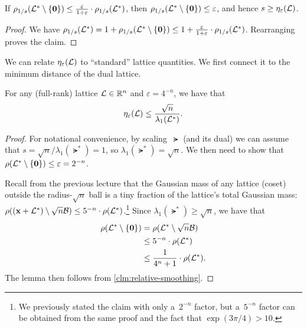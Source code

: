 \documentclass[11pt]{article}
\begin{document}
\begin{claim}
  \label{clm:relative-smoothing}
  If
  $\rho_{1/s}(\mathcal{L}^* \setminus \{\mathbf{0}\}) \leq
  \frac{\varepsilon}{1+\varepsilon} \cdot \rho_{1/s}(\mathcal{L}^*)$, then
  $\rho_{1/s}(\mathcal{L}^* \setminus \{\mathbf{0}\}) \leq \varepsilon$, and
  hence $s \geq \eta_{\varepsilon}(\mathcal{L})$.
\end{claim}

\begin{proof}
  We have
  $\rho_{1/s}(\mathcal{L}^*) = 1 + \rho_{1/s}(\mathcal{L}^* \setminus
  \{\mathbf{0}\}) \leq 1 + \frac{\varepsilon}{1+\varepsilon} \cdot
  \rho_{1/s}(\mathcal{L}^{*})$. Rearranging proves the claim.
\end{proof}

We can relate $\eta_\varepsilon(\mathcal{L})$ to ``standard'' lattice
quantities. We first connect it to the minimum distance of the dual
lattice.

\begin{lemma}
  For any (full-rank) lattice $\mathcal{L} \in \mathbb{R}^{n}$ and
  $\varepsilon = 4^{-n}$, we have that
  \[ \eta_\varepsilon(\mathcal{L}) \leq
    \frac{\sqrt{n}}{\lambda_1(\mathcal{L}^*)} . \]
\end{lemma}

\begin{proof}
  For notational convenience, by scaling~$\lat$ (and its dual) we can
  assume that $s = \sqrt{n}/\lambda_{1}(\lat^{*}) = 1$, so
  $\lambda_{1}(\lat^{*}) = \sqrt{n}$. We then need to show that
  $\rho(\mathcal{L}^* \setminus \{\mathbf{0}\}) \leq \varepsilon = 2^{-n}$.

  Recall from the previous lecture that the Gaussian mass of any
  lattice (coset) outside the radius-$\sqrt{n}$ ball is a tiny
  fraction of the lattice's total Gaussian mass:
  $\rho((\mathbf{x}+\mathcal{L}^*) \setminus \sqrt{n}\mathcal{B}) \leq 5^{-n} \cdot
  \rho(\mathcal{L}^*)$.\footnote{We previously stated the claim with only
    a~$2^{-n}$ factor, but a~$5^{-n}$ factor can be obtained from the
    same proof and the fact that $\exp(3 \pi/4) > 10$.} Since
  $\lambda_1(\lat^*) \geq \sqrt{n}$, we have that
  \begin{align*}
    \rho(\mathcal{L}^{*} \setminus \{\mathbf{0}\})
    &= \rho(\mathcal{L}^{*} \setminus \sqrt{n} \mathcal{B}) \\
    &\leq 5^{-n} \cdot \rho(\mathcal{L}^{*}) \\
    &\leq \frac{1}{4^{n}+1} \cdot \rho(\mathcal{L}^{*}).
  \end{align*}
  The lemma then follows from \cref{clm:relative-smoothing}.
\end{proof}
\end{document}
